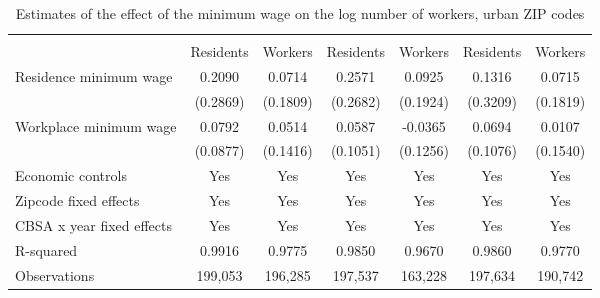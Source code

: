 \begin{table}[hbt!] \centering
    \caption{Estimates of the effect of the minimum wage on the log number of workers, urban ZIP codes}
    \label{tab:total_migration}
    \begin{tabular}{lcccccc}
        \toprule 
        &  &  &  \\ \cmidrule(lr){2-3} \cmidrule(lr){4-5} \cmidrule(lr){6-7}
        & Residents & Workers & Residents & Workers & Residents & Workers \\  \midrule
        Residence minimum wage &  0.2090  &  0.0714  &  0.2571  &  0.0925  &  0.1316  &  0.0715  \\
                               & (0.2869) & (0.1809) & (0.2682) & (0.1924) & (0.3209) & (0.1819) \\
        Workplace minimum wage &  0.0792  &  0.0514  &  0.0587  &  -0.0365  &  0.0694  &  0.0107  \\
                               & (0.0877) & (0.1416) & (0.1051) & (0.1256) & (0.1076) & (0.1540) \\  \midrule
        Economic controls           &  Yes   &  Yes  &  Yes   &  Yes   &  Yes  &  Yes  \\
        Zipcode fixed effects       &  Yes   &  Yes  &  Yes   &  Yes   &  Yes  &  Yes  \\
        CBSA x year fixed effects   &  Yes   &  Yes  &  Yes   &  Yes   &  Yes  &  Yes  \\
        R-squared                   &  0.9916   &  0.9775  &  0.9850   &  0.9670   &  0.9860  &  0.9770  \\
        Observations                &  199,053  &  196,285 &  197,537  &  163,228  &  197,634 &  190,742  
        \\\bottomrule
    \end{tabular}
    

\end{table}

